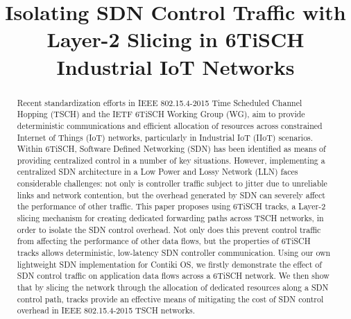 \documentclass[conference]{IEEEtran}
\begin{document}
\title{Isolating SDN Control Traffic with Layer-2 Slicing in 6TiSCH Industrial IoT Networks}

\author{

}
\maketitle

\begin{abstract}
Recent standardization efforts in IEEE 802.15.4-2015 Time Scheduled Channel Hopping (TSCH) and the IETF 6TiSCH Working Group (WG), aim to provide deterministic communications and efficient allocation of resources across constrained Internet of Things (IoT) networks, particularly in Industrial IoT (IIoT) scenarios. Within 6TiSCH, Software Defined Networking (SDN) has been identified as means of providing centralized control in a number of key situations. However, implementing a centralized SDN architecture in a Low Power and Lossy Network (LLN) faces considerable challenges: not only is controller traffic subject to jitter due to unreliable links and network contention, but the overhead generated by SDN can severely affect the performance of other traffic. This paper proposes using 6TiSCH tracks, a Layer-2 slicing mechanism for creating dedicated forwarding paths across TSCH networks, in order to isolate the SDN control overhead. Not only does this prevent control traffic from affecting the performance of other data flows, but the properties of 6TiSCH tracks allows deterministic, low-latency SDN controller communication. Using our own lightweight SDN implementation for Contiki OS, we firstly demonstrate the effect of SDN control traffic on application data flows across a 6TiSCH network. We then show that by slicing the network through the allocation of dedicated resources along a SDN control path, tracks provide an effective means of mitigating the cost of SDN control overhead in IEEE 802.15.4-2015 TSCH networks.
\end{abstract}
\end{document}
